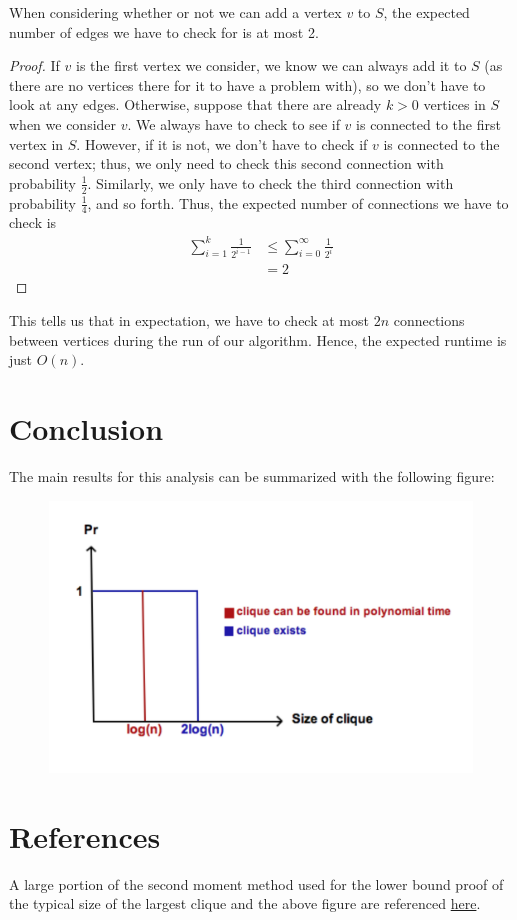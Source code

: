 \documentclass{article}
\begin{document}
\begin{claim}
When considering whether or not we can add a vertex $v$ to $S$, the expected number of edges we have to check for is at most 2.
\end{claim}
\vspace{-0.3in}
\begin{proof}
If $v$ is the first vertex we consider, we know we can always add it to $S$ (as there are no vertices there for it to have a problem with), so we don't have to look at any edges.  Otherwise, suppose that there are already $k > 0$ vertices in $S$ when we consider $v$.  We always have to check to see if $v$ is connected to the first vertex in $S$.  However, if it is not, we don't have to check if $v$ is connected to the second vertex; thus, we only need to check this second connection with probability $\frac{1}{2}$.  Similarly, we only have to check the third connection with probability $\frac{1}{4}$, and so forth.  Thus, the expected number of connections we have to check is
\begin{align*}
\sum_{i = 1}^k \frac{1}{2^{i - 1}} &\leq \sum_{i = 0}^\infty \frac{1}{2^i} \\
&= 2
\end{align*}
\end{proof}
This tells us that in expectation, we have to check at most $2n$ connections between vertices during the run of our algorithm.  Hence, the expected runtime is just $O(n)$.

\section{Conclusion}
The main results for this analysis can be summarized with the following figure:

\begin{figure}[h]
    \centering
    \includegraphics[width=\textwidth]{conclusion}
\end{figure}

\section{References}
A large portion of the second moment method used for the lower bound proof of
the typical size of the largest clique and the above figure are referenced
\href{https://theory.epfl.ch/courses/topicstcs/Lecture1.pdf}{here}.
\end{document}
